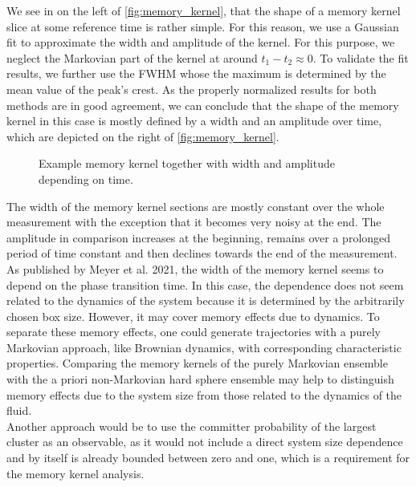 We see in on the left of \autoref{fig:memory_kernel}, that the shape of a memory kernel slice at some reference time is rather simple. For this reason, we use a Gaussian fit to approximate the width and amplitude of the kernel. For this purpose, we neglect the Markovian part of the kernel at around $t_1-t_2 \approx 0$. To validate the fit results, we further use the FWHM whose the maximum is determined by the mean value of the peak's crest. As the properly normalized results for both methods are in good agreement, we can conclude that the shape of the memory kernel in this case is mostly defined by a width and an amplitude over time, which are depicted on the right of \autoref{fig:memory_kernel}.\\

\begin{figure}[h]
\begin{center}
 \hspace{0.5cm}
\caption[Width and amplitude of memory kernel with example slice]{Example memory kernel together with width and amplitude depending on time.}
\label{fig:memory_kernel}
\end{center}
\end{figure}

The width of the memory kernel sections are mostly constant over the whole measurement with the exception that it becomes very noisy at the end. The amplitude in comparison increases at the beginning, remains over a prolonged period of time constant and then declines towards the end of the measurement.\\
As published by Meyer et al. 2021\cite{Meyer2021}, the width of the memory kernel seems to depend on the phase transition time. In this case, the dependence does not seem related to the dynamics of the system because it is determined by the arbitrarily chosen box size. However, it may cover memory effects due to dynamics. To separate these memory effects, one could generate trajectories with a purely Markovian approach, like Brownian dynamics, with corresponding characteristic properties. Comparing the memory kernels of the purely Markovian ensemble with the a priori non-Markovian hard sphere ensemble may help to distinguish memory effects due to the system size from those related to the dynamics of the fluid.\\

Another approach would be to use the committer probability of the largest cluster as an observable, as it would not include a direct system size dependence and by itself is already bounded between zero and one, which is a requirement for the memory kernel analysis.
\FloatBarrier
